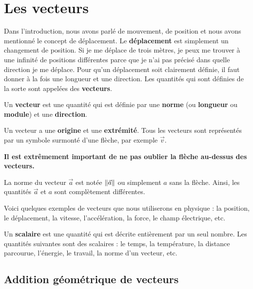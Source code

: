 \chapter{Les vecteurs}

Dans l'introduction, nous avons parlé de mouvement, de position et nous avons
mentionné le concept de déplacement.  Le \textbf{déplacement} est simplement un
changement de position.  Si je me déplace de trois mètres, je peux me trouver à
une infinité de positions différentes parce que je n'ai pas précisé dans quelle
direction je me déplace.  Pour qu'un déplacement soit clairement définie, il
faut donner à la fois une longueur et une direction.  Les quantités qui sont
définies de la sorte sont appelées des \textbf{vecteurs}.

\begin{defn}[vecteur]
  Un \textbf{vecteur} est une quantité qui est définie par une \textbf{norme}
  (ou \textbf{longueur} ou \textbf{module}) et une \textbf{direction}.
\end{defn}

Un vecteur a une \textbf{origine} et une \textbf{extrémité}.  Tous les vecteurs
sont représentés par un symbole surmonté d'une flèche, par exemple $\vec{v}$.

\begin{center}
\end{center}

\textbf{Il est extrêmement important de ne pas oublier la flèche au-dessus des
vecteurs.}

La norme du vecteur $\vec{a}$ est notée $\lVert \vec{a} \rVert$ ou simplement $a$ sans la
flèche.  Ainsi, les quantités $\vec{a}$ et $a$ sont complètement différentes.

Voici quelques exemples de vecteurs que nous utiliserons en physique : la
position, le déplacement, la vitesse, l'accélération, la force, le champ
électrique, etc.

Un \textbf{scalaire} est une quantité qui est décrite entièrement par un seul
nombre.  Les quantités suivantes sont des scalaires : le temps, la température,
la distance parcourue, l'énergie, le travail, la norme d'un vecteur, etc.


\section{Addition géométrique de vecteurs}

